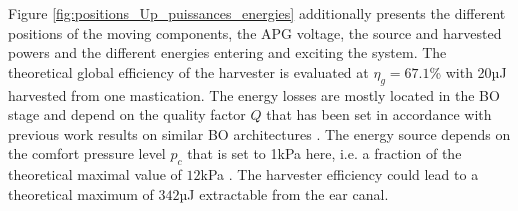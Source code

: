 \documentclass[3p,twocolumn,preprint]{elsarticle}
\begin{document}
Figure \ref{fig:positions_Up_puissances_energies} additionally presents the different positions of the moving components, the APG voltage, the source and harvested powers and the different energies entering and exciting the system. The theoretical global efficiency of the harvester is evaluated at $\eta_g=67.1$\% with 20µJ harvested from one mastication. The energy losses are mostly located in the BO stage and depend on the quality factor $Q$ that has been set in accordance with previous work results on similar BO architectures \cite{Liu2013}. The energy source depends on the comfort pressure level $p_c$ that is set to 1kPa here, i.e. a fraction of the theoretical maximal value of $12$kPa \cite{Bouchard-Roy2020}. The harvester efficiency could lead to a theoretical maximum of $342$µJ extractable from the ear canal.
\end{document}
